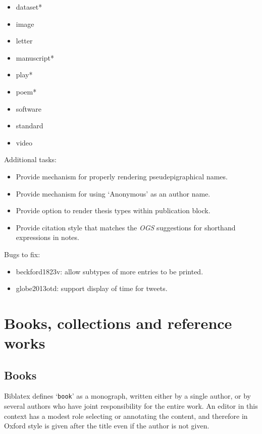 \documentclass[extrafontsizes,11pt,a4paper,oneside]{memoir}
\newcommand*{\code}[1]{`\texttt{#1}'}
\begin{document}
\begin{multicols}{2}
  \begin{itemize}\firmlist
    \item dataset*
    \item image
    \item letter
    \item manuscript*
    \item play*
    \item poem*
    \item software
    \item standard
    \item video
  \end{itemize}
\end{multicols}

Additional tasks:

\begin{itemize}
  \item Provide mechanism for properly rendering pseudepigraphical names.
  \item Provide mechanism for using ‘Anonymous’ as an author name.
  \item Provide option to render thesis types within publication block.
  \item Provide citation style that matches the \emph{OGS} suggestions for shorthand expressions in notes.
\end{itemize}

Bugs to fix:

\begin{itemize}
  \item beckford1823v: allow subtypes of more entries to be printed.
  \item globe2013otd: support display of time for tweets.
\end{itemize}

\chapter{Books, collections and reference works}\label{sec:book}

\section{Books}

Biblatex defines \code{book} as a monograph, written either by a single author, or by several authors who have joint responsibility for the entire work. An editor in this context has a modest role selecting or annotating the content, and therefore in Oxford style is given after the title even if the author is not given.
\end{document}
